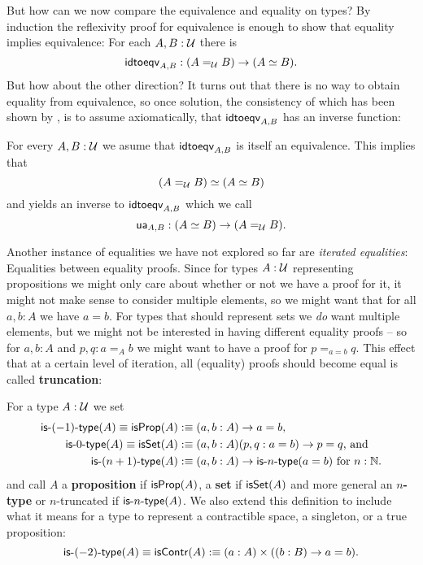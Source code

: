 But how can we now compare the equivalence and equality on types?
By induction the reflexivity proof for equivalence is enough to show that
equality implies equivalence:
For each $A, B : \mathcal{U}$ there is
\begin{equation*}
\mathsf{idtoeqv}_{A, B} : (A =_{\mathcal{U}} B) \to (A \simeq B) \text{.}
\end{equation*}
But how about the other direction?
It turns out that there is no way to obtain equality from equivalence,
so once solution,
the consistency of which has been shown by \cite{kapulkinlumsdaine},
is to assume axiomatically, that $\mathsf{idtoeqv}_{A, B}$ has an inverse function:
\begin{axiom}[Univalence]
For every $A, B: \mathcal{U}$ we asume that
$\mathsf{idtoeqv}_{A, B}$ is itself an equivalence.
This implies that
\begin{equation*}
(A =_{\mathcal{U}} B) \simeq (A \simeq B)
\end{equation*}
and yields an inverse to $\mathsf{idtoeqv}_{A, B}$ which we call
\begin{equation*}
\mathsf{ua}_{A, B} : (A \simeq B) \to (A =_{\mathcal{U}} B) \text{.}
\end{equation*}
\end{axiom}

Another instance of equalities we have not explored so far are \emph{iterated equalities}:
Equalities between equality proofs.
Since for types $A : \mathcal{U}$ representing propositions we might only care about whether
or not we have a proof for it, it might not make sense to
consider multiple elements, so we might want that for all $a, b : A$ we have $a = b$.
For types that should represent sets we \emph{do} want multiple elements, but
we might not be interested in having different equality proofs --
so for $a, b : A$ and $p, q : a =_A b$ we might want to have a proof for $p =_{a = b} q$.
This effect that at a certain level of iteration, all (equality) proofs should become
equal is called \textbf{truncation}:
\begin{defn}[$n$-types]
For a type $A : \mathcal{U}$ we set
\begin{align*}
\mathsf{is}\mbox{-}{(-1)}\mbox{-}\mathsf{type}{(A)} \equiv \mathsf{isProp}(A) &:\equiv (a, b : A) \to a = b \text{,} \\
\mathsf{is}\mbox{-}{0}\mbox{-}\mathsf{type}{(A)} \equiv \mathsf{isSet}(A)  &:\equiv (a, b : A)(p, q : a = b) \to p = q \text{, and} \\
\mathsf{is}\mbox{-}{(n + 1)}\mbox{-}\mathsf{type}{(A)} &:\equiv (a, b : A) \to \mathsf{is}\mbox{-}{n}\mbox{-}\mathsf{type}{(a = b)} \text{ for $n : \mathbb{N}$.}
\end{align*}
and call $A$ a \textbf{proposition} if $\mathsf{isProp}(A)$, a \textbf{set} if $\mathsf{isSet}(A)$ and more
general an
\textbf{$n$-type} or $n$-truncated if $\mathsf{is}\mbox{-}{n}\mbox{-}\mathsf{type}{(A)}$.
We also extend this definition to include what it means for a type to represent a
contractible space, a singleton, or a true proposition:
\begin{equation*}
\mathsf{is}\mbox{-}{(-2)}\mbox{-}\mathsf{type}{(A)} \equiv \mathsf{isContr}(A) :\equiv (a : A) \times ((b : B) \to a = b) \text{.}
\end{equation*}
\end{defn}


